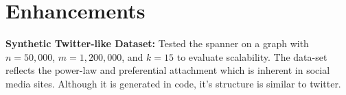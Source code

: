 \documentclass[12pt]{article}
\begin{document}
\section*{Enhancements}

\textbf{Synthetic Twitter-like Dataset:} Tested the spanner on a graph with $n=50{,}000$, $m=1{,}200{,}000$, and $k=15$ to evaluate scalability. The data-set reflects the power-law and preferential attachment which is inherent in social media sites. Although it is generated in code, it's structure is similar to twitter.
\end{document}
